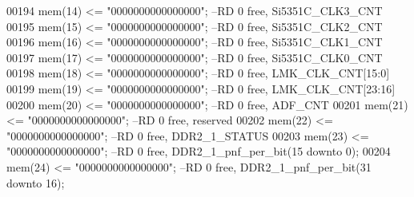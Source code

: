 \begin{DoxyCode}
00194          \textcolor{vhdlchar}{mem}\textcolor{vhdlchar}{(}\textcolor{vhdllogic}{}\textcolor{vhdllogic}{14}\textcolor{vhdlchar}{)}  \textcolor{vhdlchar}{<=} \textcolor{vhdllogic}{"0000000000000000"};\textcolor{keyword}{ --RD   0 free, Si5351C\_CLK3\_CNT}
00195          \textcolor{vhdlchar}{mem}\textcolor{vhdlchar}{(}\textcolor{vhdllogic}{}\textcolor{vhdllogic}{15}\textcolor{vhdlchar}{)}  \textcolor{vhdlchar}{<=} \textcolor{vhdllogic}{"0000000000000000"};\textcolor{keyword}{ --RD   0 free, Si5351C\_CLK2\_CNT}
00196          \textcolor{vhdlchar}{mem}\textcolor{vhdlchar}{(}\textcolor{vhdllogic}{}\textcolor{vhdllogic}{16}\textcolor{vhdlchar}{)}  \textcolor{vhdlchar}{<=} \textcolor{vhdllogic}{"0000000000000000"};\textcolor{keyword}{ --RD   0 free, Si5351C\_CLK1\_CNT}
00197          \textcolor{vhdlchar}{mem}\textcolor{vhdlchar}{(}\textcolor{vhdllogic}{}\textcolor{vhdllogic}{17}\textcolor{vhdlchar}{)}  \textcolor{vhdlchar}{<=} \textcolor{vhdllogic}{"0000000000000000"};\textcolor{keyword}{ --RD   0 free, Si5351C\_CLK0\_CNT}
00198          \textcolor{vhdlchar}{mem}\textcolor{vhdlchar}{(}\textcolor{vhdllogic}{}\textcolor{vhdllogic}{18}\textcolor{vhdlchar}{)}  \textcolor{vhdlchar}{<=} \textcolor{vhdllogic}{"0000000000000000"};\textcolor{keyword}{ --RD   0 free, LMK\_CLK\_CNT[15:0]  }
00199          \textcolor{vhdlchar}{mem}\textcolor{vhdlchar}{(}\textcolor{vhdllogic}{}\textcolor{vhdllogic}{19}\textcolor{vhdlchar}{)}  \textcolor{vhdlchar}{<=} \textcolor{vhdllogic}{"0000000000000000"};\textcolor{keyword}{ --RD   0 free, LMK\_CLK\_CNT[23:16] }
00200          \textcolor{vhdlchar}{mem}\textcolor{vhdlchar}{(}\textcolor{vhdllogic}{}\textcolor{vhdllogic}{20}\textcolor{vhdlchar}{)}  \textcolor{vhdlchar}{<=} \textcolor{vhdllogic}{"0000000000000000"};\textcolor{keyword}{ --RD   0 free, ADF\_CNT   }
00201          \textcolor{vhdlchar}{mem}\textcolor{vhdlchar}{(}\textcolor{vhdllogic}{}\textcolor{vhdllogic}{21}\textcolor{vhdlchar}{)}  \textcolor{vhdlchar}{<=} \textcolor{vhdllogic}{"0000000000000000"};\textcolor{keyword}{ --RD   0 free, reserved}
00202          \textcolor{vhdlchar}{mem}\textcolor{vhdlchar}{(}\textcolor{vhdllogic}{}\textcolor{vhdllogic}{22}\textcolor{vhdlchar}{)}  \textcolor{vhdlchar}{<=} \textcolor{vhdllogic}{"0000000000000000"};\textcolor{keyword}{ --RD   0 free, DDR2\_1\_STATUS}
00203          \textcolor{vhdlchar}{mem}\textcolor{vhdlchar}{(}\textcolor{vhdllogic}{}\textcolor{vhdllogic}{23}\textcolor{vhdlchar}{)}  \textcolor{vhdlchar}{<=} \textcolor{vhdllogic}{"0000000000000000"};\textcolor{keyword}{ --RD   0 free, DDR2\_1\_pnf\_per\_bit(15 downto 0);}
00204          \textcolor{vhdlchar}{mem}\textcolor{vhdlchar}{(}\textcolor{vhdllogic}{}\textcolor{vhdllogic}{24}\textcolor{vhdlchar}{)}  \textcolor{vhdlchar}{<=} \textcolor{vhdllogic}{"0000000000000000"};\textcolor{keyword}{ --RD   0 free, DDR2\_1\_pnf\_per\_bit(31 downto 16);}

\end{DoxyCode}
